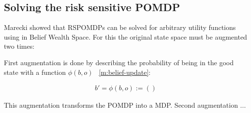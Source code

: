 

\subsection{Solving the risk sensitive POMDP}
Marecki \cite{marecki} showed that RSPOMDPs can be solved for arbitrary utility functions using  in Belief Wealth Space.
For this the original state space must be augmented two times:

\begin{figure}[H]
\begin {center}
\end{center}
\end{figure}

First augmentation is done by describing the probability of being in the good state with a function $\phi(b,o)$ ~\autoref{m:belief-update}:

\begin{align}
    b' = \phi(b,o) := ()
\end{align}

This augmentation transforms the POMDP into a MDP.
Second augmentation ...